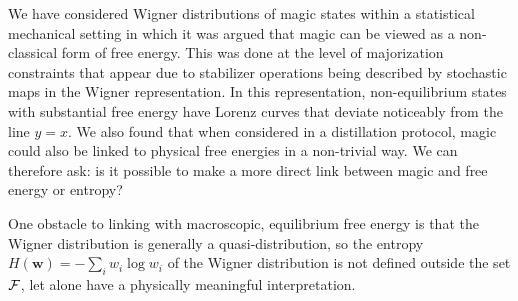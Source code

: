 \documentclass[
onecolumn,
superscriptaddress
]{revtex4-1}
\def\w{\boldsymbol{w}}
\def\F{{\cal F}}
\begin{document}
We have considered Wigner distributions of magic states within a statistical mechanical setting in which it was argued that magic can be viewed as a non-classical form of free energy. This was done at the level of majorization constraints that appear due to stabilizer operations being described by stochastic maps in the Wigner representation. In this representation, non-equilibrium states with substantial free energy have Lorenz curves that deviate noticeably from the line $y=x$. We also found that when considered in a distillation protocol, magic could also be linked to physical free energies in a non-trivial way. We can therefore ask: is it possible to make a more direct link between magic and free energy or entropy?

One obstacle to linking with macroscopic, equilibrium free energy is that the Wigner distribution is generally a quasi-distribution, so the entropy $H(\w) = -\sum_i w_i \log w_i$ of the Wigner distribution is not defined outside the set $\F$, let alone have a physically meaningful interpretation.
 
\end{document}
